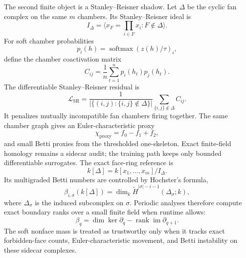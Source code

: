 \documentclass[11pt]{article}
\theoremstyle{definition}
\theoremstyle{plain}
\theoremstyle{remark}
\numberwithin{equation}{section}
\newcommand{\softmax}{\operatorname{softmax}}
\newcommand{\rank}{\operatorname{rank}}
\begin{document}
The second finite object is a Stanley--Reisner shadow.  Let $\Delta$ be the cyclic fan complex on the same $m$ chambers.  Its Stanley--Reisner ideal is
\begin{equation}
  I_\Delta=\langle x_F=\prod_{i\in F}x_i:F\notin\Delta\rangle.
\end{equation}
For soft chamber probabilities
\begin{equation}
  p_i(h)=\softmax(z(h)/\tau)_i,
\end{equation}
define the chamber coactivation matrix
\begin{equation}
  C_{ij}=\frac1n\sum_{t=1}^n p_i(h_t)p_j(h_t).
\end{equation}
The differentiable Stanley--Reisner residual is
\begin{equation}
  \mathcal L_{\mathrm{SR}}
  =
  \frac{1}{|\{(i,j):\{i,j\}\notin\Delta\}|}
  \sum_{\{i,j\}\notin\Delta} C_{ij}.
\end{equation}
It penalizes mutually incompatible fan chambers firing together.  The same chamber graph gives an Euler-characteristic proxy
\begin{equation}
  \chi_{\mathrm{proxy}}=f_0-f_1+f_2,
\end{equation}
and small Betti proxies from the thresholded one-skeleton.  Exact finite-field homology remains a sidecar audit; the training path keeps only bounded differentiable surrogates.
The exact face-ring reference is
\begin{equation}
  k[\Delta]=k[x_1,\ldots,x_m]/I_\Delta.
\end{equation}
Its multigraded Betti numbers are controlled by Hochster's formula,
\begin{equation}
  \beta_{i,\sigma}(k[\Delta])
  =
  \dim_k \widetilde H^{|\sigma|-i-1}(\Delta_\sigma;k),
\end{equation}
where $\Delta_\sigma$ is the induced subcomplex on $\sigma$.  Periodic analyses therefore compute exact boundary ranks over a small finite field when runtime allows:
\begin{equation}
  \beta_q=\dim\ker \partial_q-\rank\operatorname{im}\partial_{q+1}.
\end{equation}
The soft nonface mass is treated as trustworthy only when it tracks exact forbidden-face counts, Euler-characteristic movement, and Betti instability on these sidecar complexes.
\end{document}
